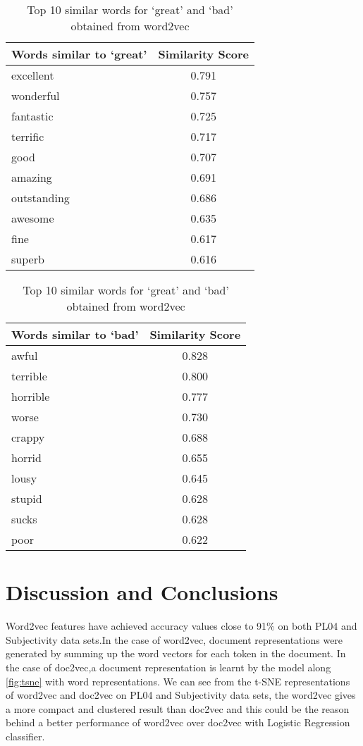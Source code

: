 \documentclass[a4paper,26pt]{article}
\begin{document}
\begin{table}[H]
\centering
\parbox{.45\linewidth}
{
\begin{tabular}{|l|c|}
\hline
\textbf{Words similar to `great'} & \textbf{Similarity Score} \\ \hline
excellent     & 0.791        \\ 
wonderful     & 0.757        \\ 
fantastic     & 0.725        \\
terrific      & 0.717        \\
good          & 0.707        \\
amazing       & 0.691        \\
outstanding   & 0.686        \\
awesome       & 0.635        \\
fine          & 0.617         \\
superb        & 0.616         \\ \hline
\end{tabular}
}
\quad
\parbox{.45\linewidth}{\begin{tabular}{|l|c|}
\hline
\textbf{Words similar to `bad'} & \textbf{Similarity Score} \\ \hline
awful         & 0.828        \\
terrible      & 0.800        \\
horrible      & 0.777        \\
worse         & 0.730        \\
crappy        & 0.688        \\
horrid        & 0.655        \\
lousy         & 0.645        \\
stupid        & 0.628        \\
sucks         & 0.628        \\
poor          & 0.622       \\ \hline
\end{tabular}
}
\caption{Top 10 similar words for `great' and `bad' obtained from word2vec}
\label{tab:word2vec_similarities}
\end{table}

\section{Discussion and Conclusions}
Word2vec features have achieved accuracy values close to 91\% on both PL04 and Subjectivity data sets.In the case of word2vec, document representations were generated by summing up the word vectors for each token in the document. In the case of doc2vec,a document representation is learnt by the model along \ref{fig:tsne} with word representations. We can see from the t-SNE representations of word2vec and doc2vec on PL04 and Subjectivity data sets, the word2vec gives a more compact and clustered result than doc2vec and this could be the reason behind a better performance of word2vec over doc2vec with Logistic Regression classifier.

\printbibliography
\end{document}

